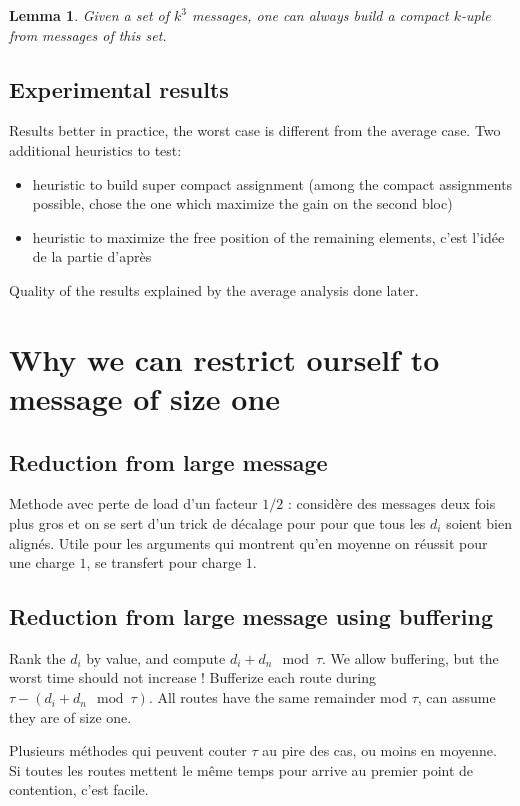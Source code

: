 \documentclass[10pt, conference, letterpaper]{IEEEtran}
\newtheorem{lemma}[theorem]{Lemma}
\begin{document}
\begin{lemma}
Given a set of $k^3$ messages, one can always build a compact $k$-uple
from messages of this set. 
\end{lemma}

\subsection{Experimental results}

Results better in practice, the worst case is different from the 
average case.
Two additional heuristics to test:
\begin{itemize}
	\item  heuristic to build super compact assignment (among the compact assignments
possible, chose the one which maximize the gain on the second bloc)
	\item heuristic to maximize the free position of the remaining elements, c'est l'idée
	de la partie d'après
\end{itemize}

Quality of the results explained by the average analysis done later.
 

\section{Why we can restrict ourself to message of size one}

\subsection{Reduction from large message}

Methode avec perte de load d'un facteur $1/2$ : considère 
des messages deux fois plus gros et on se sert d'un trick de décalage pour 
pour que tous les $d_i$ soient bien alignés.  
Utile pour les arguments qui montrent qu'en moyenne on
réussit pour une charge $1$, se transfert pour charge $1$.


\subsection{Reduction from large message using buffering}
Rank the $d_i$ by value, and compute $d_i + d_n \mod \tau$.
We allow buffering, but the worst time should not increase !
Bufferize  each route during $\tau - (d_i + d_n \mod \tau)$.
All routes have the same remainder mod $\tau$, can assume they are of 
size one.

Plusieurs méthodes qui peuvent couter $\tau$ au pire des cas, ou moins en moyenne.
Si toutes les routes mettent le même temps pour arrive au premier
point de contention, c'est facile.
\end{document}
